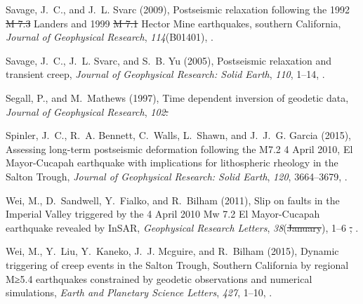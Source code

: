 \documentclass[draft,linenumbers]{AGUJournal}
\providecommand{\DIFadd}[1]{{\protect\color{blue}\uwave{#1}}} %
\providecommand{\DIFdel}[1]{{\protect\color{red}\sout{#1}}}                      %
\providecommand{\DIFaddbegin}{} %
\providecommand{\DIFaddend}{} %
\providecommand{\DIFdelbegin}{} %
\providecommand{\DIFdelend}{} %
\begin{document}
\begin{thebibliography}{52}
Savage, J.~C., and J.~L. Svarc (2009), {Postseismic relaxation following the 1992 \DIFdelbegin \DIFdel{M 7.3 }\DIFdelend \DIFaddbegin \DIFadd{M7.3 }\DIFaddend Landers and 1999 \DIFdelbegin \DIFdel{M 7.1 }\DIFdelend \DIFaddbegin \DIFadd{M7.1 }\DIFaddend Hector Mine earthquakes, southern California}, \textit{Journal of Geophysical Research}, \textit{114}(B01401), .

Savage, J.~C., J.~L. Svarc, and S.~B. Yu (2005), {Postseismic relaxation and transient creep}, \textit{Journal of Geophysical Research: Solid Earth}, \textit{110}\DIFaddbegin \DIFadd{(B11402)}\DIFaddend , 1--14, .

Segall, P., and M.~Mathews (1997), {Time dependent inversion of geodetic data}, \textit{Journal of Geophysical Research}, \textit{102}\DIFdelbegin \DIFdel{.
}\DIFdelend \DIFaddbegin \DIFadd{(B10). 22391--22409 
}\DIFaddend 

Spinler, J.~C., R.~A. Bennett, C.~Walls, L.~Shawn, and J.~J.~G. Garcia (2015), {Assessing long-term postseismic deformation following the M7.2 4 April 2010, El Mayor-Cucapah earthquake with implications for lithospheric rheology in the Salton Trough}, \textit{Journal of Geophysical Research: Solid Earth}, \textit{120}, 3664--3679, \DIFdelbegin %
\DIFdelend \DIFaddbegin {}\DIFaddend .

Wei, M., D.~Sandwell, Y.~Fialko, and R.~Bilham (2011{}), {Slip on faults in the Imperial Valley triggered by the 4 April 2010 Mw 7.2 El Mayor-Cucapah earthquake revealed by InSAR}, \textit{Geophysical Research Letters}, \textit{38}(\DIFdelbegin \DIFdel{January}\DIFdelend \DIFaddbegin \DIFadd{L01308}\DIFaddend ), 1--6 \DIFdelbegin \DIFdel{, }\DIFdelend {}.

Wei, M., Y.~Liu, Y.~Kaneko, J.~J. Mcguire, and R.~Bilham (2015), {Dynamic triggering of creep events in the Salton Trough, Southern California by regional M≥5.4 earthquakes constrained by geodetic observations and numerical simulations}, \textit{Earth and Planetary Science Letters}, \textit{427}, 1--10, .


\end{thebibliography}
\end{document}
